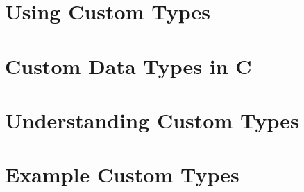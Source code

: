 







\clearpage
\section{Using Custom Types} %
\label{sec:using_custom_types}




\clearpage
\def\pageLang{c}
\section{Custom Data Types in C} %
\label{sec:custom_types_in_c}









\clearpage
\def\pageLang{none}
\section{Understanding Custom Types} %
\label{sec:understanding_custom_types}





\clearpage
\section{Example Custom Types} %
\label{sec:example_custom_types}

